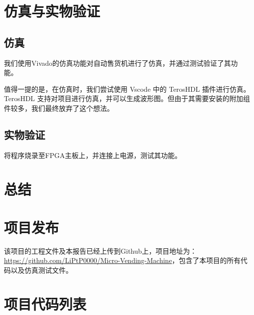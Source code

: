 \documentclass[12pt]{SEU-Circuit-Report}
\renewcommand\appendix{\par
    \setcounter{section}{0}
    \setcounter{subsection}{0}
    \gdef\thesection{附录 \Alph{section}}}
\begin{document}
    \section{仿真与实物验证}
    \subsection{仿真}
    我们使用Vivado的仿真功能对自动售货机进行了仿真，并通过测试验证了其功能。

    值得一提的是，在仿真时，我们尝试使用 Vscode 中的 TerosHDL 插件进行仿真。TerosHDL 支持对项目进行仿真，并可以生成波形图。但由于其需要安装的附加组件较多，我们最终放弃了这个想法。
    \subsection{实物验证}
    将程序烧录至FPGA主板上，并连接上电源，测试其功能。
    \section{总结}
    \newpage
    \appendix

    \section{项目发布}
    该项目的工程文件及本报告已经上传到Github上，项目地址为：\url{https://github.com/LiPtP0000/Micro-Vending-Machine}，包含了本项目的所有代码以及仿真测试文件。
    \section{项目代码列表}
    
\end{document}
